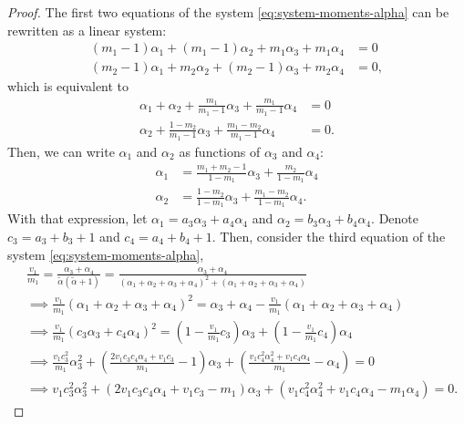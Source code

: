 \begin{proof}

The first two equations of the system \eqref{eq:system-moments-alpha} can be
rewritten as a linear system:
\begin{align*}
  (m_1 - 1)\alpha_1 + (m_1 - 1)\alpha_2 + m_1\alpha_3 + m_1\alpha_4 &= 0 \\
  (m_2 - 1)\alpha_1 + m_2\alpha_2 + (m_2-1)\alpha_3 + m_2\alpha_4 &= 0,   
\end{align*}
which is equivalent to 
\begin{align*}
  \alpha_1 + \alpha_2 + \frac{m_1}{m_1-1}\alpha_3 + \frac{m_1}{m_1-1}\alpha_4 &= 0 \\
  \alpha_2 + \frac{1-m_2}{m_1-1}\alpha_3 + \frac{m_1-m_2}{m_1-1}\alpha_4 &= 0.
\end{align*}
Then, we can write $\alpha_1$ and $\alpha_2$ as functions of $\alpha_3$ and
$\alpha_4$:
\begin{align}
  \alpha_1 &= \frac{m_1+m_2-1}{1-m_1}\alpha_3 + \frac{m_2}{1-m_1}\alpha_4 \\
  \alpha_2 &= \frac{1-m_2}{1-m_1}\alpha_3 + \frac{m_1-m_2}{1-m_1}\alpha_4.
\end{align}
With that expression, let $\alpha_1 = a_3\alpha_3 + a_4\alpha_4$ and $\alpha_2
= b_3\alpha_3 + b_4\alpha_4$. Denote $c_3 = a_3 + b_3 + 1$ and $c_4 = a_4 +
b_4 + 1$. Then, consider the third equation of the system
\eqref{eq:system-moments-alpha}, 
\begin{equation*}
  \begin{split}
    &\frac{v_1}{m_1} = \frac{\alpha_3+\alpha_4}{\tilde{\alpha}(\tilde{\alpha} +1)} = \frac{\alpha_3+\alpha_4}{(\alpha_1+\alpha_2+\alpha_3+\alpha_4)^2 + (\alpha_1+\alpha_2+\alpha_3+\alpha_4)} \\
     &\implies \frac{v_1}{m_1}(\alpha_1 + \alpha_2 + \alpha_3 + \alpha_4)^2 = \alpha_3 + \alpha_4 - \frac{v_1}{m_1}(\alpha_1 + \alpha_2 + \alpha_3 + \alpha_4) \\
    &\implies \frac{v_1}{m_1}(c_3\alpha_3 + c_4\alpha_4)^2 = \left(1-\frac{v_1}{m_1}c_3\right)\alpha_3 + \left(1-\frac{v_1}{m_1}c_4\right)\alpha_4 \\
    &\implies \frac{v_1c_3^2}{m_1}\alpha_3^2 + \left(\frac{2v_1c_3c_4\alpha_4+v_1c_3}{m_1} - 1\right)\alpha_3 + \left(\frac{v_1c_4^2\alpha_4^2 + v_1c_4\alpha_4}{m_1} - \alpha_4\right) = 0 \\ 
    &\implies v_1c_3^2\alpha_3^2 + (2v_1c_3c_4\alpha_4+v_1c_3 - m_1)\alpha_3 + (v_1c_4^2\alpha_4^2 + v_1c_4\alpha_4 - m_1\alpha_4) = 0.
  \end{split}

\end{equation*}
\end{proof}
